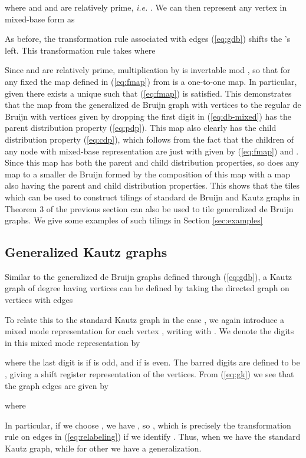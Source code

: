 \documentclass[12pt]{article}
\begin{document}
where  and  and  are relatively prime, {\it i.e.} .  We
can then represent any vertex  in mixed-base form as

As before, the transformation rule associated with edges (\ref{eq:gdb})
shifts the 's left.  This transformation rule
takes  where

Since  and  are relatively prime, multiplication by  is
invertable mod , so that
for any fixed   the map defined in (\ref{eq:fmap}) from  is a one-to-one map.  In particular, given 
there exists a unique  such that (\ref{eq:fmap}) is satisfied.
This demonstrates that the map from the generalized de Bruijn graph
with  vertices to the regular de Bruijn with  vertices given
by dropping the first digit  in (\ref{eq:db-mixed}) has the parent
distribution property (\ref{eq:pdp}).  This map also clearly has the
child distribution property (\ref{eq:cdp}), which follows from the
fact that the children of any node with mixed-base representation
 are just  with  given by
(\ref{eq:fmap}) and .  Since this map has both the
parent and child distribution properties, so does any  map to
a smaller de Bruijn formed by the  composition of this map with a map
 also having the parent
and child distribution properties.  This shows that the tiles which
can be used to construct tilings of standard de Bruijn and Kautz
graphs in Theorem 3 of the previous section can also be used to tile
generalized de Bruijn graphs.  We give
some examples of such tilings in Section \ref{sec:examples}

\subsection{Generalized Kautz graphs}

Similar to the generalized de Bruijn graphs defined through
(\ref{eq:gdb}), a Kautz graph of degree  having  vertices can be
defined by taking the directed graph on vertices  with
edges

To relate this to the standard Kautz graph in the case , we again introduce a mixed mode representation for each vertex
, writing  with .  We denote the digits in
this mixed mode representation by

where the last digit is  if  is odd, and  if  is
even.
The barred digits are defined to be , giving a
shift register representation of the vertices.  From (\ref{eq:gk}) we
see that the graph edges are given by

where

In particular, if we choose , we have , so , which is precisely
the transformation rule on edges in (\ref{eq:relabeling}) if we
 identify .  Thus, when  we have the standard
 Kautz graph, while for other  we have a generalization.
\end{document}
